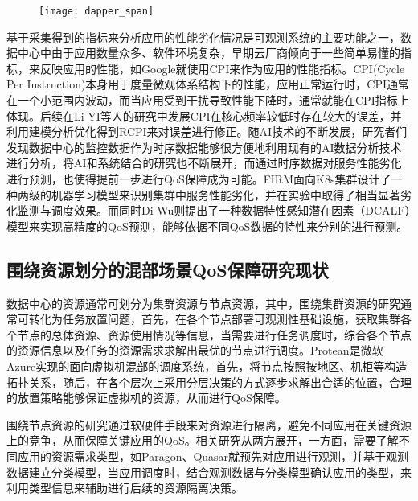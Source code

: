 \begin{figure}[H]
    \centering
    \texttt{[image: dapper\_span]}
    \label{fig:parties_app_dif}
\end{figure}

基于采集得到的指标来分析应用的性能劣化情况是可观测系统的主要功能之一，数据中心中由于应用数量众多、软件环境复杂，早期云厂商倾向于一些简单易懂的指标，来反映应用的性能，如Google就使用CPI\citep{zhang2013cpi2}来作为应用的性能指标。CPI(Cycle Per Instruction)本身用于度量微观体系结构下的性能，应用正常运行时，CPI通常在一个小范围内波动，而当应用受到干扰导致性能下降时，通常就能在CPI指标上体现。后续在Li YI等人的研究中\citep{yi2020cpi}发展CPI在核心频率较低时存在较大的误差，并利用建模分析优化得到RCPI来对误差进行修正。随AI技术的不断发展，研究者们发现数据中心的监控数据作为时序数据能够很方便地利用现有的AI数据分析技术进行分析，将AI和系统结合的研究也不断展开，而通过时序数据对服务性能劣化进行预测\citep{qiu2020firm, zhou2022aquatope, wang2022deepscaling, gan2021sage, ghafouri2020survey,zheng2020web,wu2019posterior}，也使得提前一步进行QoS保障成为可能。FIRM\citep{qiu2020firm}面向K8s集群设计了一种两级的机器学习模型来识别集群中服务性能劣化，并在实验中取得了相当显著劣化监测与调度效果。而同时Di Wu\citep{wu2020data}则提出了一种数据特性感知潜在因素（DCALF）模型来实现高精度的QoS预测，能够依据不同QoS数据的特性来分别的进行预测。

\subsection{围绕资源划分的混部场景QoS保障研究现状}


数据中心的资源通常可划分为集群资源与节点资源，其中，围绕集群资源的研究通常可转化为任务放置问题，首先，在各个节点部署可观测性基础设施，获取集群各个节点的总体资源、资源使用情况等信息，当需要进行任务调度时，综合各个节点的资源信息以及任务的资源需求求解出最优的节点进行调度。Protean\citep{hadary2020protean}是微软Azure实现的面向虚拟机混部的调度系统，首先，将节点按照按地区、机柜等构造拓扑关系，随后，在各个层次上采用分层决策的方式逐步求解出合适的位置，合理的放置策略能够保证虚拟机的资源，从而进行QoS保障。

围绕节点资源的研究通过软硬件手段来对资源进行隔离，避免不同应用在关键资源上的竞争，从而保障关键应用的QoS。相关研究从两方展开，一方面，需要了解不同应用的资源需求类型，如Paragon\citep{delimitrou2013paragon}、Quasar\citep{delimitrou2014quasar}就预先对应用进行观测，并基于观测数据建立分类模型，当应用调度时，结合观测数据与分类模型确认应用的类型，来利用类型信息来辅助进行后续的资源隔离决策。

